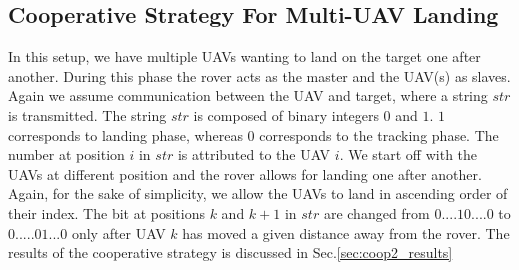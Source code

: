 \documentclass[conf]{new-aiaa}
\begin{document}
\subsection{Cooperative Strategy For Multi-UAV Landing}\label{sec:coop2}
In this setup, we have multiple UAVs wanting to land on the target one after another. During this phase the rover acts as the master and the UAV(s) as slaves. Again we assume communication between the UAV and target, where a string $str$ is transmitted. The string $str$ is composed of binary integers $0$ and $1$. $1$ corresponds to landing phase, whereas $0$ corresponds to the tracking phase. The number at position $i$ in $str$ is attributed to the UAV $i$. We start off with the UAVs at different position and the rover allows for landing one after another. Again, for the sake of simplicity, we allow the UAVs to land in ascending order of their index. The bit at positions $k$ and $k+1$ in $str$ are changed from $0....10....0$ to $0.....01...0$ only after UAV $k$ has moved a given distance away from the rover. The results of the cooperative strategy is discussed in Sec.\ref{sec:coop2_results}
\end{document}
